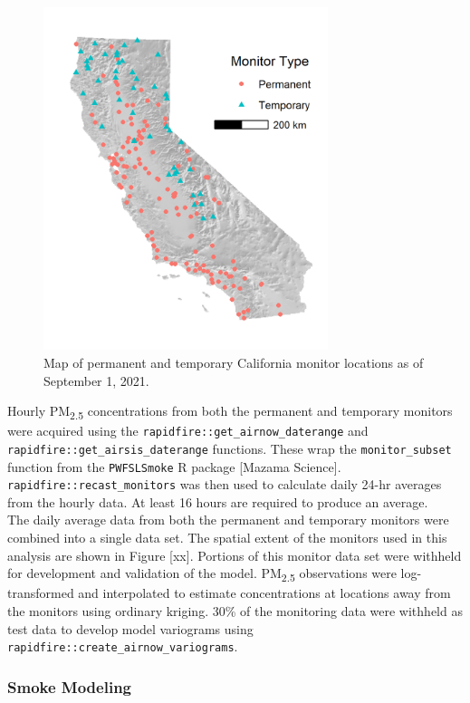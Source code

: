 \documentclass[gmd, manuscript]{copernicus}
\begin{document}
\begin{figure}[h]
\includegraphics[width=8.3cm]{./Figures/MonitorsGMD} \caption{Map of permanent and temporary California monitor locations as of September 1, 2021.}\label{fig:monitors}
\end{figure}

Hourly PM\textsubscript{2.5} concentrations from both the permanent and
temporary monitors were acquired using the
\texttt{rapidfire::get\_airnow\_daterange} and
\texttt{rapidfire::get\_airsis\_daterange} functions. These wrap the
\texttt{monitor\_subset} function from the \texttt{PWFSLSmoke} R package
{[}Mazama Science{]}. \texttt{rapidfire::recast\_monitors} was then used
to calculate daily 24-hr averages from the hourly data. At least 16
hours are required to produce an average.\\
The daily average data from both the permanent and temporary monitors
were combined into a single data set. The spatial extent of the monitors
used in this analysis are shown in Figure {[}xx{]}. Portions of this
monitor data set were withheld for development and validation of the
model. PM\textsubscript{2.5} observations were log-transformed and
interpolated to estimate concentrations at locations away from the
monitors using ordinary kriging. 30\% of the monitoring data were
withheld as test data to develop model variograms using
\texttt{rapidfire::create\_airnow\_variograms}.

\subsubsection{Smoke Modeling}
\end{document}
